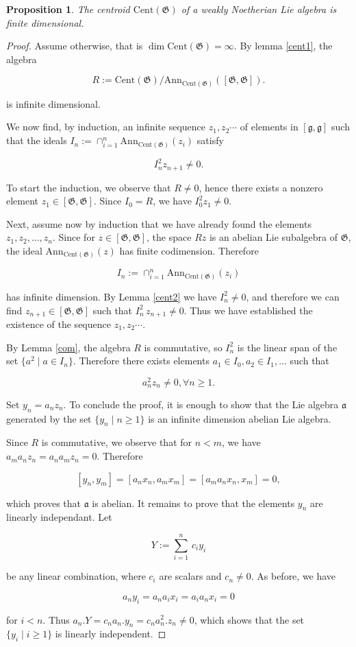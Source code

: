 \documentclass[11pt, letterpaper, reqno]{amsart}
\newtheorem{prop}[theorem]{Proposition}
\theoremstyle{definition}
\newcommand{\fa}{\mathfrak{a}}
\newcommand{\fg}{\mathfrak{g}}
\newcommand{\fG}{\mathfrak{G}}
\newcommand{\Ann}{\mathrm{Ann}}
\newcommand{\Cent}{\mathrm{Cent}}
\begin{document}
\begin{prop}\label{centroid} The centroid
$\Cent(\fG)$ of a 
 weakly Noetherian Lie algebra
is finite dimensional. 
\end{prop}

\begin{proof} Assume otherwise, that is
$\dim \Cent(\fG)=\infty$.
By lemma \ref{cent1}, the algebra

$$R:=\Cent(\fG)/\Ann_{\Cent(\fG)}([\fG,\fG]).$$

\noindent  is infinite dimensional. 




We now find,
by induction,  an infinite
sequence $z_1,z_2\cdots$ of elements
in  $[\fg,\fg]$  such that the 
ideals 
$I_n:=\cap_{i=1}^n \Ann_{\Cent(\fG)}(z_i)$ satisfy 

$$I_n^2 z_{n+1}\neq 0.$$

To start the induction, we observe that  $R\neq 0$, hence there exists a nonzero element $z_1\in [\fG,\fG]$. Since $I_0=R$, we have $I_0^2 z_1\neq 0$.

Next, assume now  by induction that we have already found the elements $z_1,z_2,\ldots, z_n$.
Since for $z\in [\fG,\fG]$, the space  $R z$ is an abelian Lie subalgebra of $\fG$, the
ideal $\Ann_{\Cent(\fG)}(z)$ has finite codimension. Therefore 

$$I_n:=\cap_{i=1}^n \Ann_{\Cent(\fG)}(z_i)$$

\noindent has infinite dimension. By 
Lemma \ref{cent2} we have $I^2_n\neq 0$, and therefore
we can find $z_{n+1}\in[\fG,\fG]$ such that
$I^2_n\,z_{n+1}\neq 0$. Thus we have established the existence of the sequence $z_1,z_2\cdots$.

By Lemma \ref{com}, the algebra $R$ is commutative, so $I^2_n$ is the linear span
of the set $\{a^2\mid a\in I_n\}$. Therefore there exists elements 
$a_1\in I_0, a_2\in I_1,\ldots$ such that

$$a_n^2 z_n\neq 0, \forall n\geq 1.$$ 

Set $y_n=a_n z_n$. To conclude the proof, it is enough to show that the Lie algebra $\fa$ generated by the 
set $\{y_n\mid n\geq 1\}$  is an infinite dimension abelian Lie algebra. 

Since
$R$ is commutative, we observe that
for $n<m$, we have $a_m a_n z_n= a_n a_m z_n=0$.
Therefore

$$[y_n,y_m]=[a_n x_n, a_m x_m]=
[a_m a_n x_n, x_m]=0,$$

\noindent which proves that $\fa$ is abelian. It remains to prove that the elements
$y_n$ are linearly independant. Let

$$Y:=\sum_{i=1}^n\, c_i y_i$$

\noindent be any linear combination, where
$c_i$ are scalars and $c_n\neq 0$.
As before, we have

$$a_n y_i=a_na_i x_i=a_ia_nx_i=0$$ 

\noindent for $i<n$.
Thus $a_n.Y =c_n a_n.y_n=c_n a_n^2.z_n\neq 0$,
which shows that the set $\{y_i\mid i\geq 1\}$ is linearly independent.
\end{proof}
\end{document}
